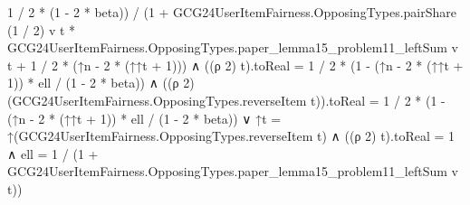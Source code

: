 \documentclass[10pt]{article}
\begin{document}
\begin{ReviewVerbatim}
                                          1 / 2 * (1 - 2 * beta)) /
                                        (1 +
                                            GCG24UserItemFairness.OpposingTypes.pairShare (1 / 2) v t *
                                              GCG24UserItemFairness.OpposingTypes.paper_lemma15_problem11_leftSum v t +
                                          1 / 2 * (↑n - 2 * (↑↑t + 1))) ∧
                                    ((ρ 2) t).toReal = 1 / 2 * (1 - (↑n - 2 * (↑↑t + 1)) * ell / (1 - 2 * beta)) ∧
                                      ((ρ 2) (GCG24UserItemFairness.OpposingTypes.reverseItem t)).toReal =
                                        1 / 2 * (1 - (↑n - 2 * (↑↑t + 1)) * ell / (1 - 2 * beta)) ∨
                                ↑t = ↑(GCG24UserItemFairness.OpposingTypes.reverseItem t) ∧
                                  ((ρ 2) t).toReal = 1 ∧
                                    ell =
                                      1 / (1 + GCG24UserItemFairness.OpposingTypes.paper_lemma15_problem11_leftSum v t))
\end{ReviewVerbatim}
\end{document}
